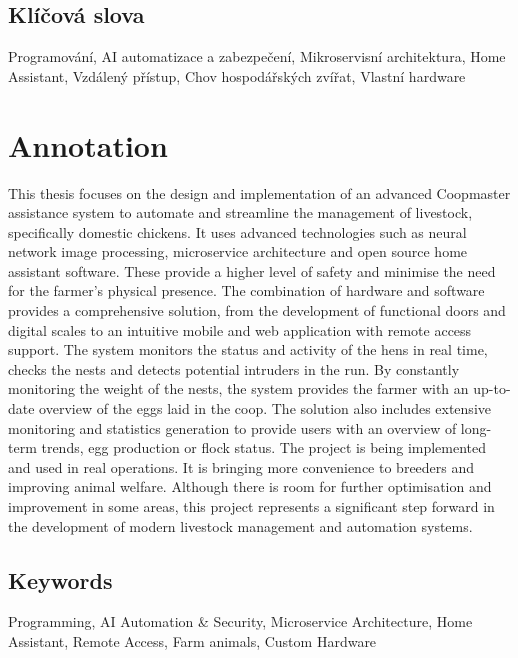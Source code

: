 \documentclass{template/socthesis}
\begin{document}
    \subsection*{Klíčová slova}
    Programování, AI automatizace a zabezpečení, Mikroservisní architektura, Home Assistant, Vzdálený přístup, Chov hospodářských zvířat, Vlastní hardware

    \vspace{20mm}

    \section*{Annotation}
    This thesis focuses on the design and implementation of an advanced Coopmaster assistance system to automate and streamline the management of livestock, specifically domestic chickens.
    It uses advanced technologies such as neural network image processing, microservice architecture and open source home assistant software.
    These provide a higher level of safety and minimise the need for the farmer's physical presence.
    The combination of hardware and software provides a comprehensive solution, from the development of functional doors and digital scales to an intuitive mobile and web application with remote access support.
    The system monitors the status and activity of the hens in real time, checks the nests and detects potential intruders in the run.
    By constantly monitoring the weight of the nests, the system provides the farmer with an up-to-date overview of the eggs laid in the coop.
    The solution also includes extensive monitoring and statistics generation to provide users with an overview of long-term trends, egg production or flock status.
    The project is being implemented and used in real operations.
    It is bringing more convenience to breeders and improving animal welfare.
    Although there is room for further optimisation and improvement in some areas, this project represents a significant step forward in the development of modern livestock management and automation systems.
    \subsection*{Keywords}
    Programming, AI Automation \& Security, Microservice Architecture, Home Assistant, Remote Access, Farm animals, Custom Hardware

    \pagestyle{plain}

    \clearpage
    \tableofcontents %
\end{document}
